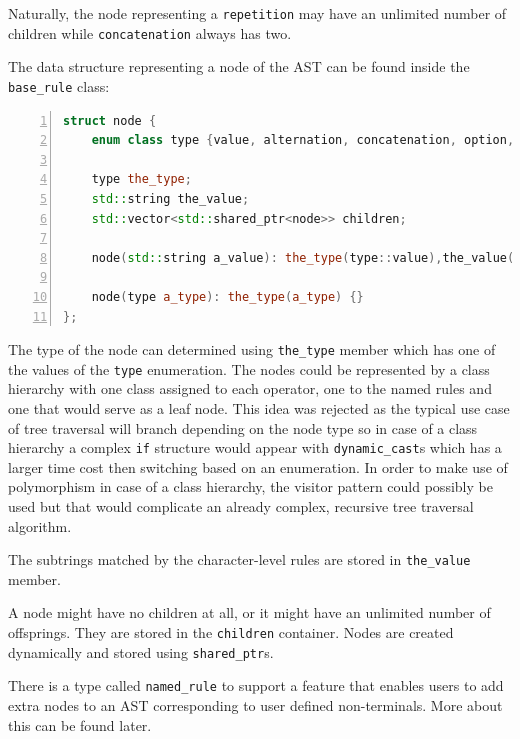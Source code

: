\documentclass[12pt]{article}
\begin{document}
Naturally, the node representing a \texttt{repetition} may have an unlimited number of children while
\texttt{concatenation} always has two.

The data structure representing a node of the AST can be found inside the \texttt{base\_rule} class:
\begin{center}
	\begin{minipage}[h]{0.9\textwidth}
		\begin{lstlisting}[language=C++, breaklines=true, numbers=left]
struct node {
	enum class type {value, alternation, concatenation, option, repetition, repetition_or_epsilon, named_rule};

	type the_type;
	std::string the_value;
	std::vector<std::shared_ptr<node>> children;

	node(std::string a_value): the_type(type::value),the_value(a_value) {}

	node(type a_type): the_type(a_type) {}
};
		\end{lstlisting}
	\end{minipage}
\end{center}

The type of the node can determined using \texttt{the\_type} member which has one of the values of the
\texttt{type} enumeration. The nodes could be represented by a class hierarchy with one class assigned to each
operator, one to the named rules and one that would serve as a leaf node. This idea was rejected as the
typical use case of tree traversal will branch depending on the node type so in case of a class hierarchy a
complex \texttt{if} structure would appear with \texttt{dynamic\_cast}s which has a larger time cost then
switching based on an enumeration. In order to make use of polymorphism in case of a class hierarchy, the
visitor pattern could possibly be used but that would complicate an already complex, recursive tree traversal
algorithm.

The subtrings matched by the character-level rules are stored in \texttt{the\_value} member.

A node might have no children at all, or it might have an unlimited number of offsprings. They are stored in
the \texttt{children} container. Nodes are created dynamically and stored using \texttt{shared\_ptr}s. 

There is a type called \texttt{named\_rule} to support a feature that enables users to add extra nodes to an
AST corresponding to user defined non-terminals.  More about this can be found later.
\end{document}
